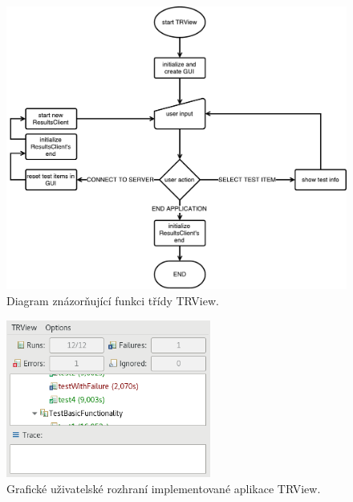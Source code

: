       \begin{figure}
	\includegraphics[width=\textwidth, height=\textheight, keepaspectratio, center]{obrazky-figures/trview_trview_flowchart.pdf}
	\caption{Diagram znázorňující funkci třídy TRView.}
	\label{fig:trview_flowchart}
	\vspace{1em}
      \end{figure}

      \begin{figure}
	\includegraphics[width=0.6\textwidth, center]{obrazky-figures/TRV_gui.png}
	\caption{Grafické uživatelské rozhraní implementované aplikace TRView.}
	\label{fig:TRV_gui}
      \end{figure}

